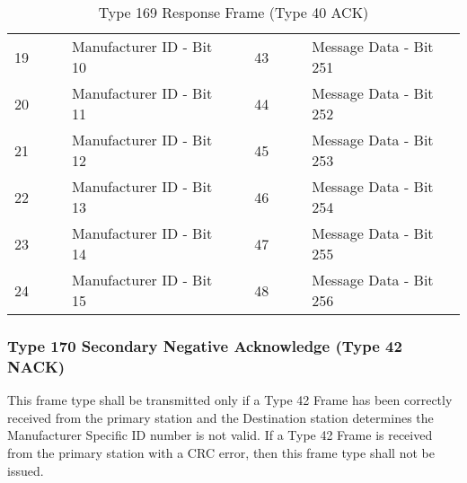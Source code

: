 \documentclass[]{article}
\begin{document}
\begin{landscape}
\begin{table}[]
\begin{tabular}{lllllllll}
			19           &                    &                   & Manufacturer ID - Bit 10      &                   & 43  &                                                                  &       & Message Data - Bit 251      \\
			20           &                    &                   & Manufacturer ID - Bit 11      &                   & 44  &                                                                  &       & Message Data - Bit 252      \\
			21           &                    &                   & Manufacturer ID - Bit 12      &                   & 45  &                                                                  &       & Message Data - Bit 253      \\
			22           &                    &                   & Manufacturer ID - Bit 13      &                   & 46  &                                                                  &       & Message Data - Bit 254      \\
			23           &                    &                   & Manufacturer ID - Bit 14      &                   & 47  &                                                                  &       & Message Data - Bit 255      \\
			24           &                    &                   & Manufacturer ID - Bit 15      &                   & 48  &                                                                  &       & Message Data - Bit 256      \\ \cline{1-4} \cline{6-9} 
		\end{tabular}
		\caption{Type 169 Response Frame (Type 40 ACK)}
		\label{tab:type-169-frame}
	\end{table}
\end{landscape}

\clearpage

\subsubsection{Type 170 Secondary Negative Acknowledge (Type 42 NACK)}
This frame type shall be transmitted only if a Type 42 Frame has been correctly received from the primary station and the Destination station determines the Manufacturer Specific ID number is not valid. If a Type 42 Frame is received from the primary station with a CRC error, then this frame type shall not be issued.
\end{document}
